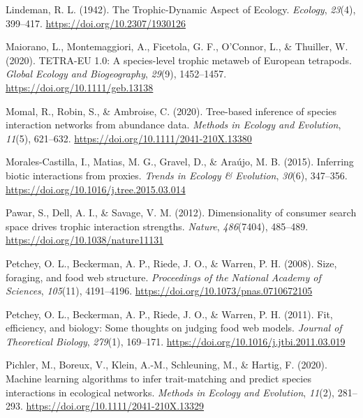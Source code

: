 \documentclass[
]{article}
\newlength{\cslhangindent}
\newenvironment{CSLReferences}[2] %
 {\begin{list}{}{%
  \setlength{\itemindent}{0pt}
  \setlength{\leftmargin}{0pt}
  \setlength{\parsep}{0pt}
  \ifodd #1
   \setlength{\leftmargin}{\cslhangindent}
   \setlength{\itemindent}{-1\cslhangindent}
  \fi
  \setlength{\itemsep}{#2\baselineskip}}}
 {\end{list}}
\begin{document}
\begin{CSLReferences}{1}{0}
Lindeman, R. L. (1942). The {Trophic-Dynamic Aspect} of {Ecology}.
\emph{Ecology}, \emph{23}(4), 399--417.
\url{https://doi.org/10.2307/1930126}

Maiorano, L., Montemaggiori, A., Ficetola, G. F., O'Connor, L., \&
Thuiller, W. (2020). {TETRA-EU} 1.0: {A} species-level trophic metaweb
of {European} tetrapods. \emph{Global Ecology and Biogeography},
\emph{29}(9), 1452--1457. \url{https://doi.org/10.1111/geb.13138}

Momal, R., Robin, S., \& Ambroise, C. (2020). Tree-based inference of
species interaction networks from abundance data. \emph{Methods in
Ecology and Evolution}, \emph{11}(5), 621--632.
\url{https://doi.org/10.1111/2041-210X.13380}

Morales-Castilla, I., Matias, M. G., Gravel, D., \& Araújo, M. B.
(2015). Inferring biotic interactions from proxies. \emph{Trends in
Ecology \& Evolution}, \emph{30}(6), 347--356.
\url{https://doi.org/10.1016/j.tree.2015.03.014}

Pawar, S., Dell, A. I., \& Savage, V. M. (2012). Dimensionality of
consumer search space drives trophic interaction strengths.
\emph{Nature}, \emph{486}(7404), 485--489.
\url{https://doi.org/10.1038/nature11131}

Petchey, O. L., Beckerman, A. P., Riede, J. O., \& Warren, P. H. (2008).
Size, foraging, and food web structure. \emph{Proceedings of the
National Academy of Sciences}, \emph{105}(11), 4191--4196.
\url{https://doi.org/10.1073/pnas.0710672105}

Petchey, O. L., Beckerman, A. P., Riede, J. O., \& Warren, P. H. (2011).
Fit, efficiency, and biology: {Some} thoughts on judging food web
models. \emph{Journal of Theoretical Biology}, \emph{279}(1), 169--171.
\url{https://doi.org/10.1016/j.jtbi.2011.03.019}

Pichler, M., Boreux, V., Klein, A.-M., Schleuning, M., \& Hartig, F.
(2020). Machine learning algorithms to infer trait-matching and predict
species interactions in ecological networks. \emph{Methods in Ecology
and Evolution}, \emph{11}(2), 281--293.
\url{https://doi.org/10.1111/2041-210X.13329}


\end{CSLReferences}
\end{document}
